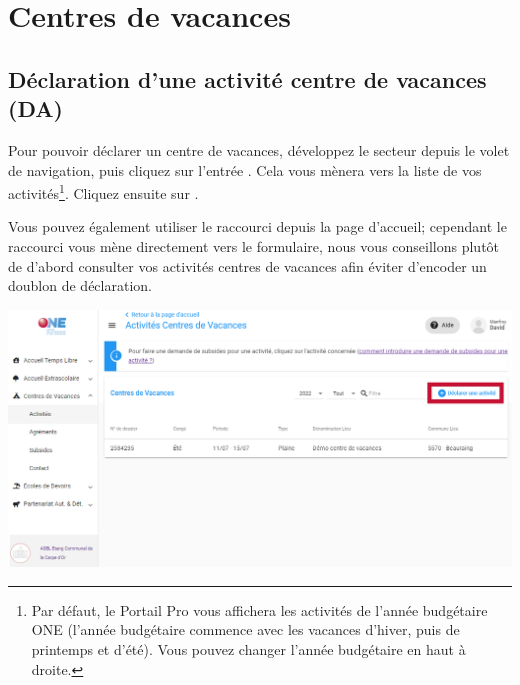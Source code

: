 \chapter{Centres de vacances}
\vspace{1.5cm}
\minitoc
\newpage

\section{Déclaration d'une activité centre de vacances (DA)}
Pour pouvoir déclarer un centre de vacances, développez le secteur  depuis le volet de navigation, puis cliquez sur l'entrée . Cela vous mènera vers la liste de vos activités\footnote{Par défaut, le Portail Pro vous affichera les activités de l'année budgétaire ONE (l'année budgétaire commence avec les vacances d'hiver, puis de printemps et d'été). Vous pouvez changer l'année budgétaire en haut à droite.}. Cliquez ensuite sur . 

Vous pouvez également utiliser le raccourci depuis la page d'accueil; cependant le raccourci vous mène directement vers le formulaire, nous vous conseillons plutôt de d'abord consulter vos activités centres de vacances afin éviter d'encoder un doublon de déclaration.  


\centerline{\includegraphics[width=14cm]{Images/cdv/liste_acti_cdv.png}}



